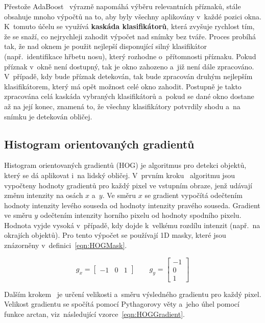 Přestože AdaBoost~\cite{website:FaceDetectionViolaJones, website:FacialRecognitionViolaJones} výrazně napomáhá výběru relevantních příznaků, stále obsahuje mnoho výpočtů na to, aby byly všechny aplikovány v~každé pozici okna. K~tomuto účelu se využívá \textbf{kaskáda klasifikátorů}, která zvyšuje rychlost tím, že se snaží, co nejrychleji zahodit výpočet nad snímky bez tváře. Proces probíhá tak, že nad oknem je použit nejlepší disponující silný klasifikátor (např.~identifikace hřbetu nosu), který rozhodne o~přítomnosti příznaku. Pokud příznak v~okně není dostupný, tak je okno zahozeno a~již není dále zpracováno. V~případě, kdy bude příznak detekován, tak bude zpracován druhým nejlepším klasifikátorem, který má opět možnost celé okno zahodit. Postupně je takto zpracována celá kaskáda vybraných klasifikátorů a~pokud se dané okno dostane až na její konec, znamená to, že všechny klasifikátory potvrdily shodu a~na snímku je detekován obličej.

\subsection{Histogram orientovaných gradientů}
Histogram orientovaných gradientů (HOG) je algoritmus pro detekci objektů, který se dá aplikovat i~na lidský obličej. V~prvním kroku~\cite{website:IntroToHOG} algoritmu jsou vypočteny hodnoty gradientů pro každý pixel ve vstupním obraze, jenž udávají změnu intenzity na osách $x$ a~$y$. Ve směru $x$ se gradient vypočítá odečtením hodnoty intenzity levého souseda od hodnoty intenzity pravého souseda. Gradient ve směru $y$ odečtením intenzity horního pixelu od hodnoty spodního pixelu. Hodnota vyjde vysoká v~případě, kdy dojde k~velkému rozdílu intenzit (např.~na okrajích objektů). Pro tento výpočet se používají 1D masky, které jsou znázorněny v~definici~\ref{eqn:HOGMask}.

\begin{equation}
    \label{eqn:HOGMask}
    g_x = 
    \begin{bmatrix}
        -1 & 0 & 1
    \end{bmatrix}
    \qquad
    g_y = 
    \begin{bmatrix}
        -1 \\
        0 \\
        1
    \end{bmatrix}
\end{equation}

Dalším krokem~\cite{website:IntroToHOG} je určení velikosti a~směru výsledného gradientu pro každý pixel. Velikost gradientu se spočítá pomocí Pythagorovy věty a~jeho úhel pomocí funkce arctan, viz~následující vzorce~\ref{eqn:HOGGradient}.

